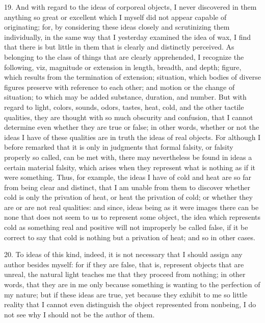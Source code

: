 19. And with regard to the ideas of corporeal objects, I never discovered in them anything so great or excellent which I myself did not appear capable of originating; for, by considering these ideas closely and scrutinizing them individually, in the same way that I yesterday examined the idea of wax, I find that there is but little in them that is clearly and distinctly perceived. As belonging to the class of things that are clearly apprehended, I recognize the following, viz, magnitude or extension in length, breadth, and depth; figure, which results from the termination of extension; situation, which bodies of diverse figures preserve with reference to each other; and motion or the change of situation; to which may be added substance, duration, and number. But with regard to light, colors, sounds, odors, tastes, heat, cold, and the other tactile qualities, they are thought with so much obscurity and confusion, that I cannot determine even whether they are true or false; in other words, whether or not the ideas I have of these qualities are in truth the ideas of real objects. For although I before remarked that it is only in judgments that formal falsity, or falsity properly so called, can be met with, there may nevertheless be found in ideas a certain material falsity, which arises when they represent what is nothing as if it were something. Thus, for example, the ideas I have of cold and heat are so far from being clear and distinct, that I am unable from them to discover whether cold is only the privation of heat, or heat the privation of cold; or whether they are or are not real qualities: and since, ideas being as it were images there can be none that does not seem to us to represent some object, the idea which represents cold as something real and positive will not improperly be called false, if it be correct to say that cold is nothing but a privation of heat; and so in other cases.

20. To ideas of this kind, indeed, it is not necessary that I should assign any author besides myself: for if they are false, that is, represent objects that are unreal, the natural light teaches me that they proceed from nothing; in other words, that they are in me only because something is wanting to the perfection of my nature; but if these ideas are true, yet because they exhibit to me so little reality that I cannot even distinguish the object represented from nonbeing, I do not see why I should not be the author of them.


